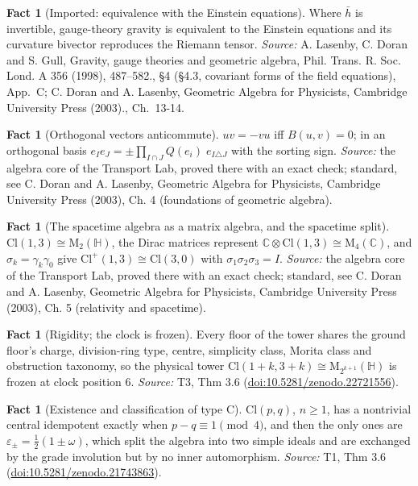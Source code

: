 \documentclass[11pt]{article}
\theoremstyle{definition}
\newtheorem{fact}[theorem]{Fact}
\theoremstyle{plain}
\providecommand{\C}{}\renewcommand{\C}{\mathbb{C}}
\providecommand{\Cl}{}\renewcommand{\Cl}{\mathrm{Cl}}
\providecommand{\HH}{}\renewcommand{\HH}{\mathbb{H}}
\providecommand{\Mat}{}\renewcommand{\Mat}{\mathrm{M}}
\providecommand{\hb}{}\renewcommand{\hb}{\bar{h}}
\begin{document}
\begin{fact}[Imported: equivalence with the Einstein equations]\label{c:singularity.imported-equivalence-einstein-equations}
Where $\hb$ is invertible, gauge-theory gravity is equivalent to the Einstein equations and its curvature bivector reproduces the Riemann tensor.
\emph{Source:} A. Lasenby, C. Doran and S. Gull, Gravity, gauge theories and geometric algebra, Phil. Trans. R. Soc. Lond. A 356 (1998), 487--582., \S 4 (\S 4.3, covariant forms of the field equations), App.~C; C. Doran and A. Lasenby, Geometric Algebra for Physicists, Cambridge University Press (2003)., Ch.~13-14.
\end{fact}

\begin{fact}[Orthogonal vectors anticommute]\label{c:std-algebra.orthogonal-anticommute}
$uv = -vu$ iff $B(u,v) = 0$; in an orthogonal basis $e_I e_J = \pm \prod_{I \cap J} Q(e_i)\; e_{I \triangle J}$ with the sorting sign.
\emph{Source:} the algebra core of the Transport Lab, proved there with an exact check; standard, see C. Doran and A. Lasenby, Geometric Algebra for Physicists, Cambridge University Press (2003), Ch. 4 (foundations of geometric algebra).
\end{fact}

\begin{fact}[The spacetime algebra as a matrix algebra, and the spacetime split]\label{c:std-algebra.sta-matrix}
$\Cl(1,3) \cong \Mat_2(\HH)$, the Dirac matrices represent $\C \otimes \Cl(1,3) \cong \Mat_4(\C)$, and $\sigma_k = \gamma_k\gamma_0$ give $\Cl^{+}(1,3) \cong \Cl(3,0)$ with $\sigma_1\sigma_2\sigma_3 = I$.
\emph{Source:} the algebra core of the Transport Lab, proved there with an exact check; standard, see C. Doran and A. Lasenby, Geometric Algebra for Physicists, Cambridge University Press (2003), Ch. 5 (relativity and spacetime).
\end{fact}

\begin{fact}[Rigidity; the clock is frozen]\label{c:tower.rigidity-clock-frozen}
Every floor of the tower shares the ground floor's charge, division-ring type, centre, simplicity class, Morita class and obstruction taxonomy, so the physical tower $\Cl(1{+}k, 3{+}k) \cong \Mat_{2^{k+1}}(\HH)$ is frozen at clock position $6$.
\emph{Source:} T3, Thm 3.6 (\href{https://doi.org/10.5281/zenodo.22721556}{doi:10.5281/zenodo.22721556}).
\end{fact}

\begin{fact}[Existence and classification of type C]\label{c:transport.existence-classification-type-c}
$\Cl(p,q)$, $n \geq 1$, has a nontrivial central idempotent exactly when $p - q \equiv 1 \pmod 4$, and then the only ones are $\varepsilon_\pm = \tfrac12(1 \pm \omega)$, which split the algebra into two simple ideals and are exchanged by the grade involution but by no inner automorphism.
\emph{Source:} T1, Thm 3.6 (\href{https://doi.org/10.5281/zenodo.21743863}{doi:10.5281/zenodo.21743863}).
\end{fact}
\end{document}
